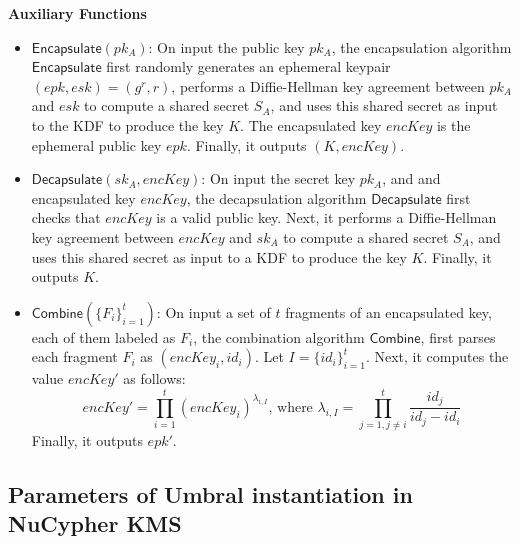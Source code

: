 \documentclass[12pt]{article}
\begin{document}
\textbf{Auxiliary Functions}
\begin{itemize}
	\item $\mathsf{Encapsulate}(pk_A)$: On input the public key $pk_A$, %
	the encapsulation algorithm $\mathsf{Encapsulate}$ first randomly generates an ephemeral keypair $(epk, esk) = (g^r, r)$, performs a Diffie-Hellman key agreement between $pk_A$ and $esk$ to compute a shared secret $S_A$, and uses this shared secret as input to the KDF to produce the key $K$. The encapsulated key $encKey$ is the ephemeral public key $epk$. Finally, it outputs $(K, encKey)$.
	\item $\mathsf{Decapsulate}(sk_A, encKey)$: On input the secret key $pk_A$, and and encapsulated key $encKey$, the decapsulation algorithm $\mathsf{Decapsulate}$ first checks that $encKey$ is a valid public key. 
	Next, it performs a Diffie-Hellman key agreement between $encKey$ and $sk_A$ to compute a shared secret $S_A$, and uses this shared secret as input to a KDF to produce the key $K$. Finally, it outputs $K$.
	\item $\mathsf{Combine}(\{F_i\}_{i=1}^t)$: On input a set of $t$ fragments of an encapsulated key, each of them labeled as $F_i$, the combination algorithm $\mathsf{Combine}$, first parses each fragment $F_i$ as $(encKey_i, id_i)$. %
Let $I = \{id_i\}_{i=1}^t$. Next, it computes the value $encKey'$ as follows:
$$encKey' = \prod\limits_{i=1}^{t} (encKey_i)^{\lambda_{i, I}}
\text{, where } \lambda_{i, I} = \prod\limits_{j=1, j\neq i}^{t} \frac{id_j}{id_j-id_i}$$
Finally, it outputs $epk'$.
\end{itemize}

\subsection{Parameters of Umbral instantiation in NuCypher KMS}



\end{document}
